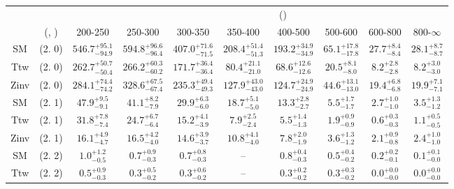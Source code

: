 \begin{table}[h!]
\tiny
\centering
{}
\begin{tabular}
{cccccccccc}
	\hline\hline
&	&	& \multicolumn{8}{c}{\scalht (\gev)}\\ 
	&	 (\njet, \nb) & 200-250 & 250-300 & 300-350 & 350-400 & 400-500 & 500-600 & 600-800 & 800-$\infty$ \\ [0.8ex] 
\hline
	SM & (2. 0) & $546.7^{+ 95.1 }_{- 94.9 }$ & $594.8^{+ 96.6 }_{- 96.4 }$ & $407.0^{+ 71.6 }_{- 71.5 }$ & $208.4^{+ 51.4 }_{- 51.3 }$ & $193.2^{+ 34.9 }_{- 34.9 }$ & $65.1^{+ 17.8 }_{- 17.8 }$ & $27.7^{+ 8.4 }_{- 8.4 }$ & $28.1^{+ 8.7 }_{- 8.7 }$ \\[0.5ex] 
	Ttw & (2. 0) & $262.7^{+ 50.7 }_{- 50.4 }$ & $266.2^{+ 60.3 }_{- 60.2 }$ & $171.7^{+ 36.4 }_{- 36.4 }$ & $80.4^{+ 21.1 }_{- 21.0 }$ & $68.6^{+ 12.6 }_{- 12.6 }$ & $20.5^{+ 8.1 }_{- 8.0 }$ & $8.2^{+ 2.8 }_{- 2.8 }$ & $8.2^{+ 3.0 }_{- 3.0 }$ \\[0.5ex] 
	Zinv & (2. 0) & $284.1^{+ 74.4 }_{- 74.2 }$ & $328.6^{+ 67.5 }_{- 67.4 }$ & $235.3^{+ 49.4 }_{- 49.3 }$ & $127.9^{+ 43.0 }_{- 43.0 }$ & $124.7^{+ 24.9 }_{- 24.9 }$ & $44.6^{+ 13.1 }_{- 13.0 }$ & $19.4^{+ 6.8 }_{- 6.8 }$ & $19.9^{+ 7.1 }_{- 7.1 }$ \\[0.5ex] 
	SM & (2. 1) & $47.9^{+ 9.5 }_{- 9.1 }$ & $41.1^{+ 8.2 }_{- 7.9 }$ & $29.9^{+ 6.3 }_{- 6.0 }$ & $18.7^{+ 5.1 }_{- 5.0 }$ & $13.3^{+ 2.8 }_{- 2.7 }$ & $5.5^{+ 1.7 }_{- 1.7 }$ & $2.7^{+ 1.0 }_{- 1.0 }$ & $3.5^{+ 1.3 }_{- 1.2 }$ \\[0.5ex] 
	Ttw & (2. 1) & $31.8^{+ 7.8 }_{- 7.4 }$ & $24.7^{+ 6.7 }_{- 6.4 }$ & $15.2^{+ 4.1 }_{- 3.9 }$ & $7.9^{+ 2.5 }_{- 2.4 }$ & $5.5^{+ 1.4 }_{- 1.3 }$ & $1.9^{+ 0.9 }_{- 0.9 }$ & $0.6^{+ 0.3 }_{- 0.3 }$ & $1.1^{+ 0.5 }_{- 0.5 }$ \\[0.5ex] 
	Zinv & (2. 1) & $16.1^{+ 4.9 }_{- 4.7 }$ & $16.5^{+ 4.2 }_{- 4.0 }$ & $14.6^{+ 3.9 }_{- 3.7 }$ & $10.8^{+ 4.1 }_{- 4.0 }$ & $7.8^{+ 2.0 }_{- 1.9 }$ & $3.6^{+ 1.3 }_{- 1.2 }$ & $2.1^{+ 0.9 }_{- 0.8 }$ & $2.4^{+ 1.0 }_{- 1.0 }$ \\[0.5ex] 
	SM & (2. 2) & $1.0^{+ 1.2 }_{- 0.5 }$ & $0.7^{+ 0.9 }_{- 0.3 }$ & $0.7^{+ 0.8 }_{- 0.3 }$ & -- & $0.8^{+ 0.4 }_{- 0.3 }$ & $0.5^{+ 0.4 }_{- 0.2 }$ & $0.2^{+ 0.2 }_{- 0.1 }$ & $0.1^{+ 0.1 }_{- 0.0 }$ \\[0.5ex] 
	Ttw & (2. 2) & $0.5^{+ 0.9 }_{- 0.3 }$ & $0.3^{+ 0.5 }_{- 0.2 }$ & $0.3^{+ 0.6 }_{- 0.2 }$ & -- & $0.3^{+ 0.2 }_{- 0.2 }$ & $0.3^{+ 0.3 }_{- 0.2 }$ & $0.0^{+ 0.0 }_{- 0.0 }$ & $0.0^{+ 0.0 }_{- 0.0 }$ \\[0.5ex] 

\end{tabular}
\end{table}
